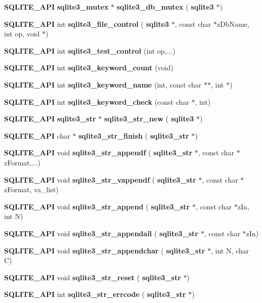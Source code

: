 \begin{DoxyCompactItemize}
\item 
\textbf{ S\+Q\+L\+I\+T\+E\+\_\+\+A\+PI} \textbf{ sqlite3\+\_\+mutex} $\ast$ \textbf{ sqlite3\+\_\+db\+\_\+mutex} (\textbf{ sqlite3} $\ast$)
\item 
\textbf{ S\+Q\+L\+I\+T\+E\+\_\+\+A\+PI} int \textbf{ sqlite3\+\_\+file\+\_\+control} (\textbf{ sqlite3} $\ast$, const char $\ast$z\+Db\+Name, int op, void $\ast$)
\item 
\textbf{ S\+Q\+L\+I\+T\+E\+\_\+\+A\+PI} int \textbf{ sqlite3\+\_\+test\+\_\+control} (int op,...)
\item 
\textbf{ S\+Q\+L\+I\+T\+E\+\_\+\+A\+PI} int \textbf{ sqlite3\+\_\+keyword\+\_\+count} (void)
\item 
\textbf{ S\+Q\+L\+I\+T\+E\+\_\+\+A\+PI} int \textbf{ sqlite3\+\_\+keyword\+\_\+name} (int, const char $\ast$$\ast$, int $\ast$)
\item 
\textbf{ S\+Q\+L\+I\+T\+E\+\_\+\+A\+PI} int \textbf{ sqlite3\+\_\+keyword\+\_\+check} (const char $\ast$, int)
\item 
\textbf{ S\+Q\+L\+I\+T\+E\+\_\+\+A\+PI} \textbf{ sqlite3\+\_\+str} $\ast$ \textbf{ sqlite3\+\_\+str\+\_\+new} (\textbf{ sqlite3} $\ast$)
\item 
\textbf{ S\+Q\+L\+I\+T\+E\+\_\+\+A\+PI} char $\ast$ \textbf{ sqlite3\+\_\+str\+\_\+finish} (\textbf{ sqlite3\+\_\+str} $\ast$)
\item 
\textbf{ S\+Q\+L\+I\+T\+E\+\_\+\+A\+PI} void \textbf{ sqlite3\+\_\+str\+\_\+appendf} (\textbf{ sqlite3\+\_\+str} $\ast$, const char $\ast$z\+Format,...)
\item 
\textbf{ S\+Q\+L\+I\+T\+E\+\_\+\+A\+PI} void \textbf{ sqlite3\+\_\+str\+\_\+vappendf} (\textbf{ sqlite3\+\_\+str} $\ast$, const char $\ast$z\+Format, va\+\_\+list)
\item 
\textbf{ S\+Q\+L\+I\+T\+E\+\_\+\+A\+PI} void \textbf{ sqlite3\+\_\+str\+\_\+append} (\textbf{ sqlite3\+\_\+str} $\ast$, const char $\ast$z\+In, int N)
\item 
\textbf{ S\+Q\+L\+I\+T\+E\+\_\+\+A\+PI} void \textbf{ sqlite3\+\_\+str\+\_\+appendall} (\textbf{ sqlite3\+\_\+str} $\ast$, const char $\ast$z\+In)
\item 
\textbf{ S\+Q\+L\+I\+T\+E\+\_\+\+A\+PI} void \textbf{ sqlite3\+\_\+str\+\_\+appendchar} (\textbf{ sqlite3\+\_\+str} $\ast$, int N, char C)
\item 
\textbf{ S\+Q\+L\+I\+T\+E\+\_\+\+A\+PI} void \textbf{ sqlite3\+\_\+str\+\_\+reset} (\textbf{ sqlite3\+\_\+str} $\ast$)
\item 
\textbf{ S\+Q\+L\+I\+T\+E\+\_\+\+A\+PI} int \textbf{ sqlite3\+\_\+str\+\_\+errcode} (\textbf{ sqlite3\+\_\+str} $\ast$)
$$
\end{DoxyCompactItemize}
